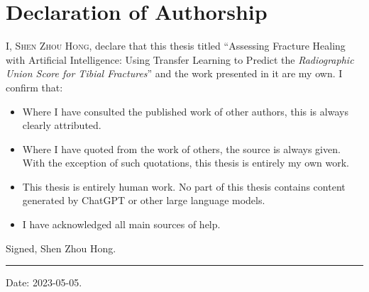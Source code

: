 \chapter{Declaration of Authorship}

I, \textsc{Shen Zhou Hong}, declare that this thesis titled \enquote{Assessing Fracture Healing with Artificial Intelligence: Using Transfer Learning to Predict the \emph{Radiographic Union Score for Tibial Fractures}} and the work presented in it are my own. I confirm that:

\begin{itemize}
    \item Where I have consulted the published work of other authors, this is always clearly attributed.
    \item Where I have quoted from the work of others, the source is always given. With the exception of such quotations, this thesis is entirely my own work.
    \item This thesis is entirely human work. No part of this thesis contains content generated by ChatGPT or other large language models.
    \item I have acknowledged all main sources of help.
\end{itemize}

\noindent
Signed, Shen Zhou Hong.

\vspace{3\baselineskip}

\hrule

\noindent
Date: 2023-05-05.
